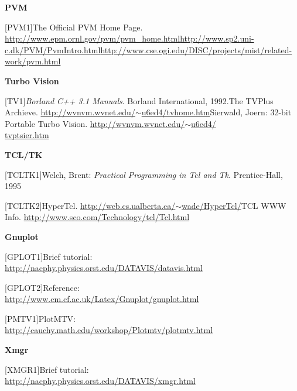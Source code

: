 \textbf{PVM}


[PVM1]\tab The Official PVM Home Page. \href{http://www.epm.ornl.gov/pvm/pvm\_home.html}{http://www.epm.ornl.gov/pvm/pvm\_home.html}\newline
[PVM2]\tab \href{http://www.sp2.uni-c.dk/PVM/PvmIntro.html}{http://www.sp2.uni-c.dk/PVM/PvmIntro.html}\newline
[PVM3]\tab \href{http://www.cse.ogi.edu/DISC/projects/mist/related-work/pvm.html}{http://www.cse.ogi.edu/DISC/projects/mist/related-work/pvm.html}


\textbf{Turbo Vision}


[TV1]\tab \textit{Borland C++ 3.1 Manuals}. Borland International, 1992.\newline
[TV2]\tab The TVPlus Archieve. \href{http://wvnvm.wvnet.edu/~u6ed4/tvhome.htm}{http://wvnvm.wvnet.edu/\ensuremath{\sim}u6ed4/tvhome.htm}\newline
[TV3]\tab Sierwald, Joern: 32-bit Portable Turbo Vision. \href{http://wvnvm.wvnet.edu/~u6ed4/tvptsier.htm}{http://wvnvm.wvnet.edu/\ensuremath{\sim}u6ed4/\\tvptsier.htm}


\textbf{TCL/TK}


[TCLTK1]\tab Welch, Brent: \textit{Practical Programming in Tcl and Tk}. 
Prentice-Hall, 1995


[TCLTK2]\tab HyperTcl. \href{http://web.cs.ualberta.ca/~wade/HyperTcl/}{http://web.cs.ualberta.ca/\ensuremath{\sim}wade/HyperTcl/}\newline
[TCLTK3]\tab TCL WWW Info. \href{http://www.sco.com/Technology/tcl/Tcl.html}{http://www.sco.com/Technology/tcl/Tcl.html}


\textbf{Gnuplot}


[GPLOT1]\tab Brief tutorial:\\
\href{http://nacphy.physics.orst.edu/DATAVIS/datavis.html}{http://nacphy.physics.orst.edu/DATAVIS/datavis.html}


[GPLOT2]\tab Reference:\\
\href{http://www.cm.cf.ac.uk/Latex/Gnuplot/gnuplot.html}{http://www.cm.cf.ac.uk/Latex/Gnuplot/gnuplot.html}


[PMTV1]\tab PlotMTV:\\
\href{http://cauchy.math.edu/workshop/Plotmtv/plotmtv.html}{http://cauchy.math.edu/workshop/Plotmtv/plotmtv.html}


\textbf{Xmgr}


[XMGR1]\tab Brief tutorial:\\
\href{http://nacphy.physics.orst.edu/DATAVIS/xmgr.html}{http://nacphy.physics.orst.edu/DATAVIS/xmgr.html}


